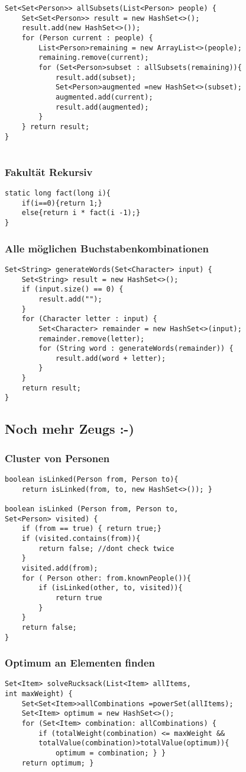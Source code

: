 \begin{multicols*}{5}
\begin{lstlisting}
Set<Set<Person>> allSubsets(List<Person> people) { 
	Set<Set<Person>> result = new HashSet<>(); 
	result.add(new HashSet<>());
	for (Person current : people) {
		List<Person>remaining = new ArrayList<>(people); 
		remaining.remove(current);
		for (Set<Person>subset : allSubsets(remaining)){
			result.add(subset);
			Set<Person>augmented =new HashSet<>(subset); 
			augmented.add(current); 
			result.add(augmented);
		} 
	} return result; 
}
	
\end{lstlisting}
\subsubsection{Fakultät Rekursiv}
\begin{lstlisting}
static long fact(long i){
	if(i==0){return 1;}
	else{return i * fact(i -1);}
}
\end{lstlisting}
	\subsubsection{Alle möglichen Buchstabenkombinationen}
	\begin{lstlisting}
Set<String> generateWords(Set<Character> input) {
	Set<String> result = new HashSet<>();
	if (input.size() == 0) {
		result.add("");
	}
	for (Character letter : input) {
		Set<Character> remainder = new HashSet<>(input);
		remainder.remove(letter);
		for (String word : generateWords(remainder)) {
			result.add(word + letter);
		}
	}
	return result;
}
	\end{lstlisting}
\subsection{Noch mehr Zeugs :-)}
	\subsubsection{Cluster von Personen}
\begin{lstlisting}
boolean isLinked(Person from, Person to){
	return isLinked(from, to, new HashSet<>()); }

boolean isLinked (Person from, Person to, 
Set<Person> visited) {
	if (from == true) { return true;}
	if (visited.contains(from)){
		return false; //dont check twice
	}
	visited.add(from);
	for ( Person other: from.knownPeople()){
		if (isLinked(other, to, visited)){
			return true	
		} 
	}
	return false; 
}
\end{lstlisting}
\subsubsection{Optimum an Elementen finden}	
\begin{lstlisting}
Set<Item> solveRucksack(List<Item> allItems, 
int maxWeight) { 
	Set<Set<Item>>allCombinations =powerSet(allItems); 
	Set<Item> optimum = new HashSet<>();
	for (Set<Item> combination: allCombinations) {
		if (totalWeight(combination) <= maxWeight && 
		totalValue(combination)>totalValue(optimum)){
			optimum = combination; } } 
	return optimum; }


\end{lstlisting}
\end{multicols*}
